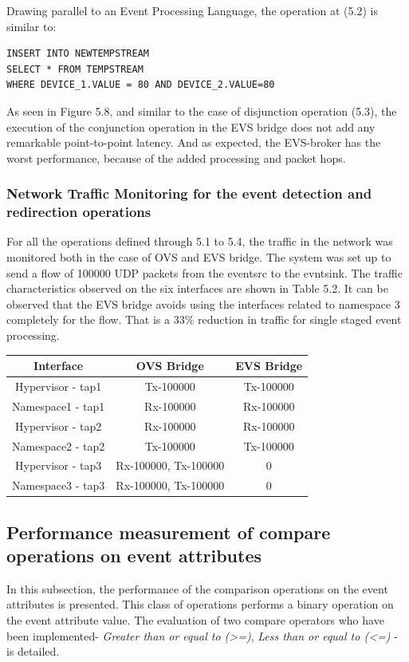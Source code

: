 Drawing parallel to an Event Processing Language, the operation at (5.2) is similar to:

\begin{verbatim}
INSERT INTO NEWTEMPSTREAM
SELECT * FROM TEMPSTREAM
WHERE DEVICE_1.VALUE = 80 AND DEVICE_2.VALUE=80
\end{verbatim}

As seen in Figure 5.8, and similar to the case of disjunction operation (5.3), the execution of the conjunction operation in the EVS bridge does not add any remarkable point-to-point latency. And as expected, the EVS-broker has the worst performance, because of the added processing and packet hops.

\subsubsection{Network Traffic Monitoring for the event detection and redirection operations}
For all the operations defined through 5.1 to 5.4, the traffic in the network was monitored both in the case of OVS and EVS bridge. The system was set up to send a flow of 100000 UDP packets from the eventsrc to the evntsink. The traffic characteristics observed on the six interfaces are shown in Table 5.2. It can be observed that the EVS bridge avoids using the interfaces related to namespace 3 completely for the flow. That is a 33\% reduction in traffic for single staged event processing.

\begin{center}
  \label{tab:title} 
 \begin{tabular}{ |c|c|c| }
  \hline
   \textbf{Interface} &  \textbf{OVS Bridg}e &  \textbf{EVS Bridge} \\\toprule
  \hline
  Hypervisor - tap1 & Tx-100000 & Tx-100000  \\
  \hline 
  Namespace1 - tap1 & Rx-100000 & Rx-100000 \\
  \hline  
  Hypervisor - tap2 &  Rx-100000 & Rx-100000  \\ 
  \hline
  Namespace2 - tap2 & Tx-100000 & Tx-100000 \\
  \hline  
  Hypervisor - tap3 & Rx-100000, Tx-100000 & 0  \\ 
  \hline
  Namespace3 - tap3 & Rx-100000, Tx-100000 & 0 \\
  \hline
 \end{tabular}
\end{center}


\subsection{Performance measurement of compare operations on event attributes}
In this subsection, the performance of the comparison operations on the event attributes is presented. This class of operations performs a binary operation on the event attribute value. The evaluation of two compare operators who have been implemented- \textit{Greater than or equal to (>=)}, \textit{Less than or equal to (<=)} - is detailed. 

